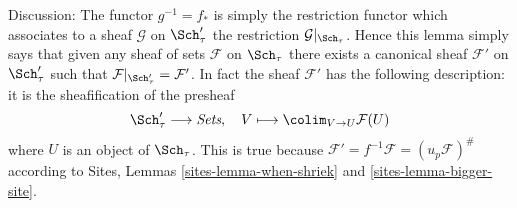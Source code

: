 \noindent
Discussion:
The functor $g^{-1} = f_*$ is simply the restriction functor which associates
to a sheaf $\mathcal{G}$ on $\Sch'_\tau$ the restriction
$\mathcal{G}|_{\Sch_\tau}$. Hence this lemma simply says that given
any sheaf of sets $\mathcal{F}$ on $\Sch_\tau$ there exists a
canonical sheaf $\mathcal{F}'$ on $\Sch'_\tau$ such that
$\mathcal{F}|_{\Sch'_\tau} = \mathcal{F}'$. In fact the sheaf
$\mathcal{F}'$ has the following description: it is the sheafification
of the presheaf
$$
\Sch'_\tau \longrightarrow \textit{Sets}, \quad
V \longmapsto \colim_{V \to U} \mathcal{F}(U)
$$
where $U$ is an object of $\Sch_\tau$. This is true because
$\mathcal{F}' = f^{-1}\mathcal{F} = (u_p\mathcal{F})^\#$ according to
Sites, Lemmas \ref{sites-lemma-when-shriek} and \ref{sites-lemma-bigger-site}.









